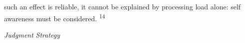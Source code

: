 \clearpage\setcounter{page}{1}\begin{styleTextbody}
such an effect is reliable, it cannot be explained by processing load alone: self\- awareness must be considered. \textsuperscript{14}
\end{styleTextbody}


\setcounter{listWWNumxxxileveli}{4}
\begin{listWWNumxxxileveli}
\item 
\setcounter{listWWNumxxxilevelii}{1}
\begin{listWWNumxxxilevelii}
\item 
\setcounter{listWWNumxxxileveliii}{4}
\begin{listWWNumxxxileveliii}
\item 
\begin{styleStandard}
\textit{Judgment}\textit{ }\textit{Strategy}
\end{styleStandard}


\end{listWWNumxxxileveliii}
\end{listWWNumxxxilevelii}
\end{listWWNumxxxileveli}
